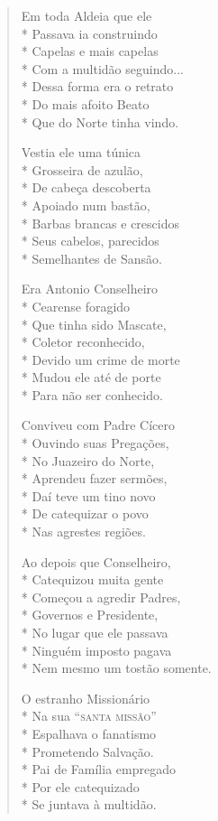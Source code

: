 \begin{verse}
Em toda Aldeia que ele\\*
Passava ia construindo\\*
Capelas e mais capelas\\*
Com a multidão seguindo...\\*
Dessa forma era o retrato\\*
Do mais afoito Beato\\*
Que do Norte tinha vindo.

Vestia ele uma túnica\\*
Grosseira de azulão,\\*
De cabeça descoberta\\*
Apoiado num bastão,\\*
Barbas brancas e crescidos\\*
Seus cabelos, parecidos\\*
Semelhantes de Sansão.

Era Antonio Conselheiro\\*
Cearense foragido\\*
Que tinha sido Mascate,\\*
Coletor reconhecido,\\*
Devido um crime de morte\\*
Mudou ele até de porte\\*
Para não ser conhecido.

Conviveu com Padre Cícero\\*
Ouvindo suas Pregações,\\*
No Juazeiro do Norte,\\*
Aprendeu fazer sermões,\\*
Daí teve um tino novo\\*
De catequizar o povo\\*
Nas agrestes regiões.

Ao depois que Conselheiro,\\*
Catequizou muita gente\\*
Começou a agredir Padres,\\*
Governos e Presidente,\\*
No lugar que ele passava\\*
Ninguém imposto pagava\\*
Nem mesmo um tostão somente.

O estranho Missionário\\*
Na sua ``\textsc{santa missão}''\\*
Espalhava o fanatismo\\*
Prometendo Salvação.\\*
Pai de Família empregado\\*
Por ele catequizado\\*
Se juntava à multidão.


\end{verse}
